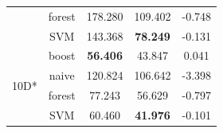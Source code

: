 \documentclass[conference,compsoc]{IEEEtran}
\begin{document}
\begin{table}[!t]
\begin{tabular}{c|c|c|c|c}
		& forest & 178.280 & 109.402 & -0.748 \\
		& SVM & 143.368 & \textbf{78.249} & -0.131 \\
		\hline
		\multirow{4}{*}{10D*}
		& boost & \textbf{56.406} & 43.847 & 0.041 \\
		& naive & 120.824 & 106.642 & -3.398 \\
		& forest & 77.243 & 56.629 & -0.797 \\
		& SVM & 60.460 & \textbf{41.976} & -0.101 \\
	\end{tabular}
\end{table}



\end{document}
